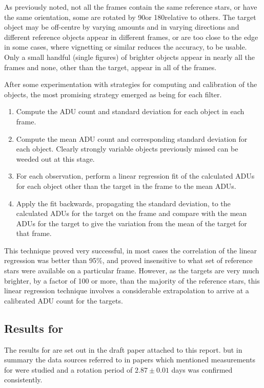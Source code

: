 As previously noted, not all the frames contain the same reference stars, or
have the same orientation, some are rotated by 90\degree or 180\degree relative to others. The
target object may be off-centre by varying amounts and in varying directions and
different reference objects appear in different frames, or are too close to the
edge in some cases, where vignetting or similar reduces the accuracy, to be
usable. Only a small handful (single figures) of brighter objects appear in
nearly all the frames and none, other than the target, appear in all of the
frames.

After some experimentation with strategies for computing and calibration of the
objects, the most promising strategy emerged as being for each filter.

\begin{enumerate}
  \item Compute the ADU count and standard deviation for each object in each
  frame.
  \item Compute the mean ADU count and corresponding standard
  deviation for each object. Clearly strongly variable objects previously missed can be weeded out
  at this stage.
  \item For each observation, perform a linear regression fit of the calculated
  ADUs for each object other than the target in the frame to the mean ADUs.
  \item Apply the fit backwards, propagating the standard deviation, to the
  calculated ADUs for the target on the frame and compare with the mean ADUs for
  the target to give the variation from the mean of the target for that frame.
\end{enumerate}

This technique proved very successful, in most cases the correlation of the
linear regression was better than 95\%, and proved insensitive to what set of
reference stars were available on a particular frame. However, as the targets
are very much brighter, by a factor of 100 or more, than the majority of the
reference stars, this linear regression technique involves a considerable
extrapolation to arrive at a calibrated ADU count for the targets.

\subsection{Results for \ross}
\protect\label{section:resultsross}

The results for {\ross} are set out in the draft paper attached to this report.
but in summary the data sources referred to in papers which mentioned
measurements for {\ross} were studied and a rotation period of $2.87 \pm 0.01$
days was confirmed consistently.

